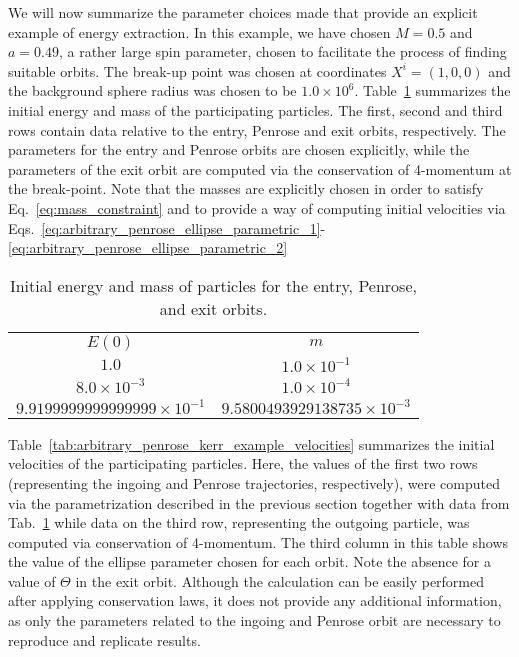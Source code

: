 We will now summarize the parameter choices made that provide an explicit example of energy extraction. In this example, we have chosen $M = 0.5$ and $a = 0.49$, a rather large spin parameter, chosen to facilitate the process of finding suitable orbits. The break-up point was chosen at coordinates $X^i = (1, 0, 0)$ and the background sphere radius was chosen to be $1.0\times 10^6$. Table~\ref{tab:arbitrary_penrose_kerr_example_energy_mass} summarizes the initial energy and mass of the participating particles. The first, second and third rows contain data relative to the entry, Penrose and exit orbits, respectively. The parameters for the entry and Penrose orbits are chosen explicitly, while the parameters of the exit orbit are computed via the conservation of 4-momentum at the break-point. Note that the masses are explicitly chosen in order to satisfy Eq.~\eqref{eq:mass_constraint} and to provide a way of computing initial velocities via Eqs.~\eqref{eq:arbitrary_penrose_ellipse_parametric_1}-\eqref{eq:arbitrary_penrose_ellipse_parametric_2}

\begin{table}[]
  \centering
  \begin{tabular}{cc}
    \hline\hline
    $E(0)$                              & $m$                                 \\
    $1.0$                               & $1.0 \times 10^{-1}$                \\
    $8.0 \times 10^{-3}$                & $1.0 \times 10^{-4}$                \\
    $9.9199999999999999 \times 10^{-1}$ & $9.5800493929138735 \times 10^{-3}$ \\ \hline\hline
  \end{tabular}
  \caption{Initial energy and mass of particles for the entry, Penrose, and exit orbits.}
  \label{tab:arbitrary_penrose_kerr_example_energy_mass}
\end{table}

Table~\ref{tab:arbitrary_penrose_kerr_example_velocities} summarizes the initial velocities of the participating particles. Here, the values of the first two rows (representing the ingoing and Penrose trajectories, respectively), were computed via the parametrization described in the previous section together with data from Tab.~\ref{tab:arbitrary_penrose_kerr_example_energy_mass} while data on the third row, representing the outgoing particle, was computed via conservation of 4-momentum. The third column in this table shows the value of the ellipse parameter chosen for each orbit. Note the absence for a value of $\Theta$ in the exit orbit. Although the calculation can be easily performed after applying conservation laws, it does not provide any additional information, as only the parameters related to the ingoing and Penrose orbit are necessary to reproduce and replicate results.

